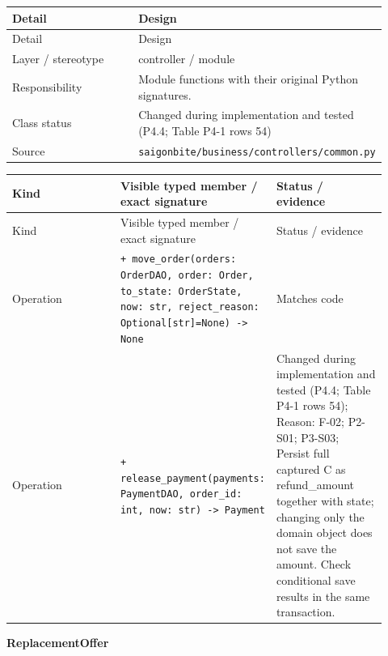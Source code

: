 \begin{longtable}{>{\raggedright\arraybackslash}p{0.4600\linewidth}>{\raggedright\arraybackslash}p{0.4600\linewidth}}
Detail & Design \\
\hline\endfirsthead
Detail & Design \\
\hline\endhead
Layer / stereotype & controller / \guillemotleft{}module\guillemotright{} \\
Responsibility & Module functions with their original Python signatures. \\
Class status & Changed during implementation and tested (P4.4; Table P4-1 rows 54) \\
Source & \texttt{saigonbite/\allowbreak{}business/\allowbreak{}controllers/\allowbreak{}common.\allowbreak{}py} \\
\end{longtable}
\begin{longtable}{>{\raggedright\arraybackslash}p{0.3067\linewidth}>{\raggedright\arraybackslash}p{0.3067\linewidth}>{\raggedright\arraybackslash}p{0.3067\linewidth}}
Kind & Visible typed member / exact signature & Status / evidence \\
\hline\endfirsthead
Kind & Visible typed member / exact signature & Status / evidence \\
\hline\endhead
Operation & \texttt{+ move\_\allowbreak{}order(orders: OrderDAO, order: Order, to\_\allowbreak{}state: OrderState, now: str, reject\_\allowbreak{}reason: Optional[str]=None) -\textgreater{} None} & Matches code \\
Operation & \texttt{+ release\_\allowbreak{}payment(payments: PaymentDAO, order\_\allowbreak{}id: int, now: str) -\textgreater{} Payment} & Changed during implementation and tested (P4.4; Table P4-1 rows 54); Reason: F-02; P2-S01; P3-S03; Persist full captured C as refund\_amount together with state; changing only the domain object does not save the amount. Check conditional save results in the same transaction. \\
\end{longtable}
\textbf{ReplacementOffer}

